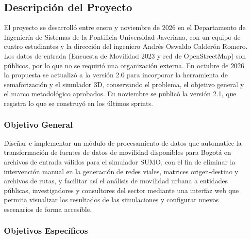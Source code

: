\subsection{Descripción del Proyecto}

El proyecto se desarrolló entre enero y noviembre de 2026 en el Departamento de Ingeniería de Sistemas de la Pontificia Universidad Javeriana, con un equipo de cuatro estudiantes y la dirección del ingeniero Andrés Oswaldo Calderón Romero. Los datos de entrada (Encuesta de Movilidad 2023 y red de OpenStreetMap) son públicos, por lo que no se requirió una organización externa. En octubre de 2026 la propuesta se actualizó a la versión 2.0 para incorporar la herramienta de semaforización y el simulador 3D, conservando el problema, el objetivo general y el marco metodológico aprobados. En noviembre se publicó la versión 2.1, que registra lo que se construyó en los últimos sprints.

\subsubsection{Objetivo General}

Diseñar e implementar un módulo de procesamiento de datos que automatice la transformación de fuentes de datos de movilidad disponibles para Bogotá en archivos de entrada válidos para el simulador SUMO, con el fin de eliminar la intervención manual en la generación de redes viales, matrices origen-destino y archivos de rutas, y facilitar así el análisis de movilidad urbana a entidades públicas, investigadores y consultores del sector mediante una interfaz web que permita visualizar los resultados de las simulaciones y configurar nuevos escenarios de forma accesible.

\subsubsection{Objetivos Específicos}

